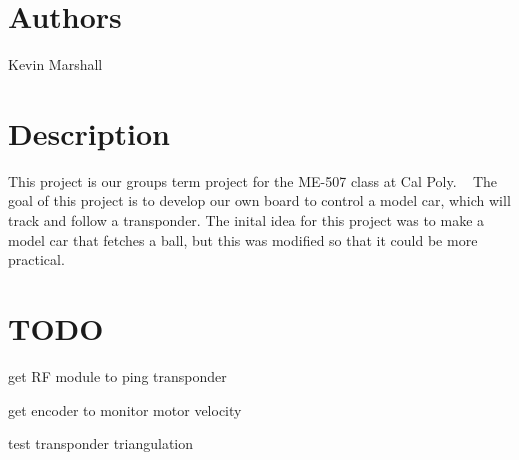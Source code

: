 \hypertarget{index_Authors}{}\section{Authors}\label{index_Authors}

\begin{DoxyItemize}
\item Kevin Marshall 
\end{DoxyItemize}\hypertarget{index_Project}{}\section{Description}\label{index_Project}
This project is our group\textquotesingle{}s term project for the M\+E-\/507 class at Cal Poly. ~\newline
The goal of this project is to develop our own board to control a model car, which will track and follow a transponder. The inital idea for this project was to make a model car that fetches a ball, but this was modified so that it could be more practical. \hypertarget{index_TODO}{}\section{T\+O\+DO}\label{index_TODO}

\begin{DoxyItemize}
\item get RF module to ping transponder
\item get encoder to monitor motor velocity
\item test transponder triangulation 
\end{DoxyItemize}
